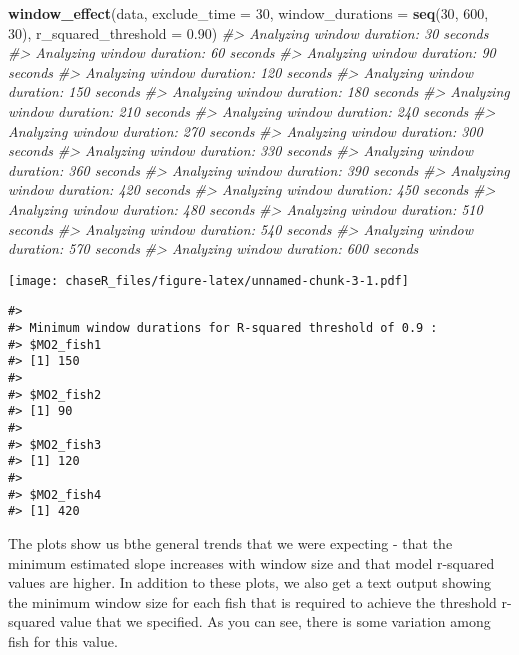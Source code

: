 \documentclass[
]{article}
\newenvironment{Shaded}{\begin{snugshade}}{\end{snugshade}}
\newcommand{\AttributeTok}[1]{\textcolor[rgb]{0.13,0.29,0.53}{#1}}
\newcommand{\CommentTok}[1]{\textcolor[rgb]{0.56,0.35,0.01}{\textit{#1}}}
\newcommand{\DecValTok}[1]{\textcolor[rgb]{0.00,0.00,0.81}{#1}}
\newcommand{\FloatTok}[1]{\textcolor[rgb]{0.00,0.00,0.81}{#1}}
\newcommand{\FunctionTok}[1]{\textcolor[rgb]{0.13,0.29,0.53}{\textbf{#1}}}
\newcommand{\NormalTok}[1]{#1}
\begin{document}
\begin{Shaded}
\begin{Highlighting}[]
\FunctionTok{window\_effect}\NormalTok{(data, }\AttributeTok{exclude\_time =} \DecValTok{30}\NormalTok{, }\AttributeTok{window\_durations =} \FunctionTok{seq}\NormalTok{(}\DecValTok{30}\NormalTok{, }\DecValTok{600}\NormalTok{, }\DecValTok{30}\NormalTok{), }\AttributeTok{r\_squared\_threshold =} \FloatTok{0.90}\NormalTok{)}
\CommentTok{\#\textgreater{} Analyzing window duration: 30 seconds}
\CommentTok{\#\textgreater{} Analyzing window duration: 60 seconds}
\CommentTok{\#\textgreater{} Analyzing window duration: 90 seconds}
\CommentTok{\#\textgreater{} Analyzing window duration: 120 seconds}
\CommentTok{\#\textgreater{} Analyzing window duration: 150 seconds}
\CommentTok{\#\textgreater{} Analyzing window duration: 180 seconds}
\CommentTok{\#\textgreater{} Analyzing window duration: 210 seconds}
\CommentTok{\#\textgreater{} Analyzing window duration: 240 seconds}
\CommentTok{\#\textgreater{} Analyzing window duration: 270 seconds}
\CommentTok{\#\textgreater{} Analyzing window duration: 300 seconds}
\CommentTok{\#\textgreater{} Analyzing window duration: 330 seconds}
\CommentTok{\#\textgreater{} Analyzing window duration: 360 seconds}
\CommentTok{\#\textgreater{} Analyzing window duration: 390 seconds}
\CommentTok{\#\textgreater{} Analyzing window duration: 420 seconds}
\CommentTok{\#\textgreater{} Analyzing window duration: 450 seconds}
\CommentTok{\#\textgreater{} Analyzing window duration: 480 seconds}
\CommentTok{\#\textgreater{} Analyzing window duration: 510 seconds}
\CommentTok{\#\textgreater{} Analyzing window duration: 540 seconds}
\CommentTok{\#\textgreater{} Analyzing window duration: 570 seconds}
\CommentTok{\#\textgreater{} Analyzing window duration: 600 seconds}
\end{Highlighting}
\end{Shaded}

\texttt{[image: chaseR\_files/figure-latex/unnamed-chunk-3-1.pdf]}

\begin{verbatim}
#> 
#> Minimum window durations for R-squared threshold of 0.9 :
#> $MO2_fish1
#> [1] 150
#> 
#> $MO2_fish2
#> [1] 90
#> 
#> $MO2_fish3
#> [1] 120
#> 
#> $MO2_fish4
#> [1] 420
\end{verbatim}

The plots show us bthe general trends that we were expecting - that the
minimum estimated slope increases with window size and that model
r-squared values are higher. In addition to these plots, we also get a
text output showing the minimum window size for each fish that is
required to achieve the threshold r-squared value that we specified. As
you can see, there is some variation among fish for this value.
\end{document}

